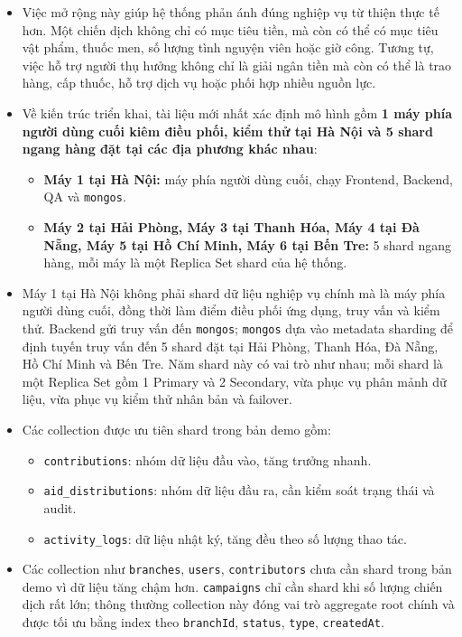 \documentclass[12pt,a4paper]{article}
\begin{document}
\begin{itemize}
\begin{itemize}
\item \texttt{disbursements} được giữ tương thích cho trường hợp phát tiền, nhưng về thiết kế có thể ánh xạ sang \texttt{aid\_distributions} với \texttt{type = MONEY}.
\end{itemize}
\item Việc mở rộng này giúp hệ thống phản ánh đúng nghiệp vụ từ thiện thực tế hơn. Một chiến dịch không chỉ có mục tiêu tiền, mà còn có thể có mục tiêu vật phẩm, thuốc men, số lượng tình nguyện viên hoặc giờ công. Tương tự, việc hỗ trợ người thụ hưởng không chỉ là giải ngân tiền mà còn có thể là trao hàng, cấp thuốc, hỗ trợ dịch vụ hoặc phối hợp nhiều nguồn lực.
\item Về kiến trúc triển khai, tài liệu mới nhất xác định mô hình gồm \textbf{1 máy phía người dùng cuối kiêm điều phối, kiểm thử tại Hà Nội và 5 shard ngang hàng đặt tại các địa phương khác nhau}:
\begin{itemize}
\item \textbf{Máy 1 tại Hà Nội:} máy phía người dùng cuối, chạy Frontend, Backend, QA và \texttt{mongos}.
\item \textbf{Máy 2 tại Hải Phòng, Máy 3 tại Thanh Hóa, Máy 4 tại Đà Nẵng, Máy 5 tại Hồ Chí Minh, Máy 6 tại Bến Tre:} 5 shard ngang hàng, mỗi máy là một Replica Set shard của hệ thống.
\end{itemize}
\item Máy 1 tại Hà Nội không phải shard dữ liệu nghiệp vụ chính mà là máy phía người dùng cuối, đồng thời làm điểm điều phối ứng dụng, truy vấn và kiểm thử. Backend gửi truy vấn đến \texttt{mongos}; \texttt{mongos} dựa vào metadata sharding để định tuyến truy vấn đến 5 shard đặt tại Hải Phòng, Thanh Hóa, Đà Nẵng, Hồ Chí Minh và Bến Tre. Năm shard này có vai trò như nhau; mỗi shard là một Replica Set gồm 1 Primary và 2 Secondary, vừa phục vụ phân mảnh dữ liệu, vừa phục vụ kiểm thử nhân bản và failover.
\item Các collection được ưu tiên shard trong bản demo gồm:
\begin{itemize}
\item \texttt{contributions}: nhóm dữ liệu đầu vào, tăng trưởng nhanh.
\item \texttt{aid\_distributions}: nhóm dữ liệu đầu ra, cần kiểm soát trạng thái và audit.
\item \texttt{activity\_logs}: dữ liệu nhật ký, tăng đều theo số lượng thao tác.
\end{itemize}
\item Các collection như \texttt{branches}, \texttt{users}, \texttt{contributors} chưa cần shard trong bản demo vì dữ liệu tăng chậm hơn. \texttt{campaigns} chỉ cần shard khi số lượng chiến dịch rất lớn; thông thường collection này đóng vai trò aggregate root chính và được tối ưu bằng index theo \texttt{branchId}, \texttt{status}, \texttt{type}, \texttt{createdAt}.
\end{itemize}
\end{document}
